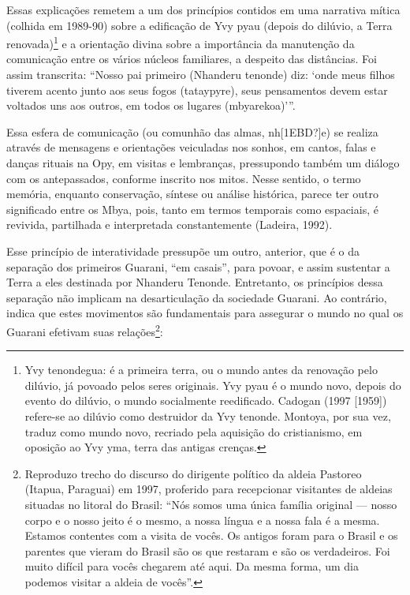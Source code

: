 \documentclass{article}
\begin{document}
Essas explica\c{c}\~oes remetem a um dos princ\'ipios contidos em uma
narrativa m\'itica (colhida em 1989-90) sobre a edifica\c{c}\~ao de Yvy
pyau (depois do dil\'uvio, a Terra renovada)\footnote{ Yvy tenondegua:
\'e a primeira terra, ou o mundo antes da renova\c{c}\~ao pelo
dil\'uvio, j\'a povoado pelos seres originais. Yvy pyau \'e o mundo
novo, depois do evento do dil\'uvio, o mundo socialmente reedificado.
Cadogan (1997 [1959]) refere-se ao dil\'uvio como destruidor da Yvy
tenonde. Montoya, por sua vez, traduz como mundo novo, recriado pela
aquisi\c{c}\~ao do cristianismo, em oposi\c{c}\~ao ao Yvy yma, terra
das antigas cren\c{c}as. } e a orienta\c{c}\~ao divina sobre a
import\^ancia da manuten\c{c}\~ao da comunica\c{c}\~ao entre os
v\'arios n\'ucleos familiares, a despeito das dist\^ancias. Foi assim
transcrita: {\textquotedblleft}Nosso pai primeiro (Nhanderu tenonde)
diz: {\textquoteleft}onde meus filhos tiverem acento junto aos seus
fogos (tataypyre), seus pensamentos devem estar voltados uns aos
outros, em todos os lugares
(mbyarekoa){\textquoteright}{\textquotedblright}. 

Essa esfera de comunica\c{c}\~ao (ou comunh\~ao das almas, nh[1EBD?]e)
se realiza atrav\'es de mensagens e orienta\c{c}\~oes veiculadas nos
sonhos, em cantos, falas e dan\c{c}as rituais na Opy, em visitas e
lembran\c{c}as, pressupondo tamb\'em um di\'alogo com os antepassados,
conforme inscrito nos mitos. Nesse sentido, o termo mem\'oria, enquanto
conserva\c{c}\~ao, s\'intese ou an\'alise hist\'orica, parece ter outro
significado entre os Mbya, pois, tanto em termos temporais como
espaciais, \'e revivida, partilhada e interpretada constantemente
(Ladeira, 1992).  

Esse princ\'ipio de interatividade pressup\~oe um outro, anterior, que
\'e o da separa\c{c}\~ao dos primeiros Guarani, {\textquotedblleft}em
casais{\textquotedblright}, para povoar, e assim sustentar a Terra a
eles destinada por Nhanderu Tenonde. Entretanto, os princ\'ipios dessa
separa\c{c}\~ao n\~ao implicam na desarticula\c{c}\~ao da sociedade
Guarani. Ao contr\'ario, indica que estes movimentos s\~ao fundamentais
para assegurar o mundo no qual os Guarani efetivam suas
rela\c{c}\~oes\footnote{ Reproduzo trecho do discurso do dirigente
pol\'itico da aldeia Pastoreo (Itapua, Paraguai) em 1997, proferido
para recepcionar visitantes de aldeias situadas no litoral do Brasil:
{\textquotedblleft}N\'os somos uma \'unica fam\'ilia original --- nosso
corpo e o nosso jeito \'e o mesmo, a nossa l\'ingua e a nossa fala \'e
a mesma. Estamos contentes com a visita de voc\^es. Os antigos foram
para o Brasil e os parentes que vieram do Brasil s\~ao os que restaram
e s\~ao os verdadeiros. Foi muito dif\'icil para voc\^es chegarem at\'e
aqui. Da mesma forma, um dia podemos visitar a aldeia de
voc\^es{\textquotedblright}.}:
\end{document}
